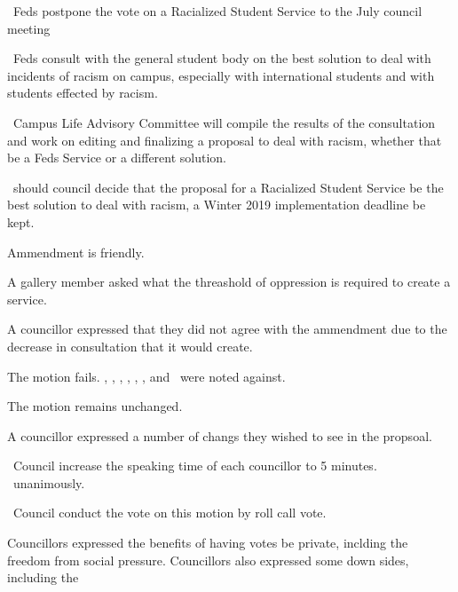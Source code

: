 \begin{motion}
\begin{motion}
\begin{motion}
            \birt\ Feds postpone the vote on a Racialized Student Service to the
            July council meeting

            \bifrt\ Feds consult with the general student body on the best solution
            to deal with incidents of racism on campus, especially with
            international students and with students effected by racism.

            \bifrt\ Campus Life Advisory Committee will compile the results of the
            consultation and work on editing and finalizing a proposal to deal with
            racism, whether that be a Feds Service or a different solution.

            \bifrt\ should council decide that the proposal for a Racialized
            Student Service be the best solution to deal with racism, a Winter 2019
            implementation deadline be kept.

            \movers{\stephanie}{\alexander}
        \end{motion}

        Ammendment is friendly.

        A gallery member asked what the threashold of oppression is required 
        to create a service.

        A councillor expressed that they did not agree with the ammendment due
        to the decrease in consultation that it would create.

        The motion fails. \katie, \jennifer, \seneca, \nickta, \rebecca, \cai,
        and \stephanie\ were noted against.

    \end{motion}

    The motion remains unchanged.

    A councillor expressed a number of changs they wished to see in the
    propsoal.

    \begin{motion}
        \birt\ Council increase the speaking time of each councillor to 5
        minutes.
        \movers{\seneca}{\cai}
        \carries\ unanimously.
    \end{motion}

    \begin{motion}
        \birt\ Council conduct the vote on this motion by roll call vote.
        \movers{\harsh}{\nickta}

        Councillors expressed the benefits of having votes be private, inclding
        the freedom from social pressure. Councillors also expressed some down
        sides, including the 


\end{motion}
\end{motion}

